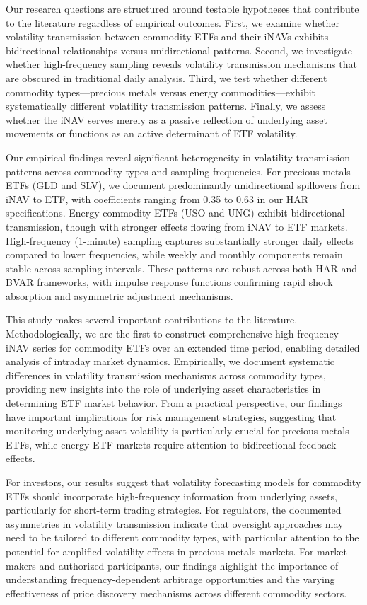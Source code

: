 Our research questions are structured around testable hypotheses that contribute to the literature regardless of empirical outcomes. First, we examine whether volatility transmission between commodity ETFs and their iNAVs exhibits bidirectional relationships versus unidirectional patterns. Second, we investigate whether high-frequency sampling reveals volatility transmission mechanisms that are obscured in traditional daily analysis. Third, we test whether different commodity types—precious metals versus energy commodities—exhibit systematically different volatility transmission patterns. Finally, we assess whether the iNAV serves merely as a passive reflection of underlying asset movements or functions as an active determinant of ETF volatility.

Our empirical findings reveal significant heterogeneity in volatility transmission patterns across commodity types and sampling frequencies. For precious metals ETFs (GLD and SLV), we document predominantly unidirectional spillovers from iNAV to ETF, with coefficients ranging from 0.35 to 0.63 in our HAR specifications. Energy commodity ETFs (USO and UNG) exhibit bidirectional transmission, though with stronger effects flowing from iNAV to ETF markets. High-frequency (1-minute) sampling captures substantially stronger daily effects compared to lower frequencies, while weekly and monthly components remain stable across sampling intervals. These patterns are robust across both HAR and BVAR frameworks, with impulse response functions confirming rapid shock absorption and asymmetric adjustment mechanisms.

This study makes several important contributions to the literature. Methodologically, we are the first to construct comprehensive high-frequency iNAV series for commodity ETFs over an extended time period, enabling detailed analysis of intraday market dynamics. Empirically, we document systematic differences in volatility transmission mechanisms across commodity types, providing new insights into the role of underlying asset characteristics in determining ETF market behavior. From a practical perspective, our findings have important implications for risk management strategies, suggesting that monitoring underlying asset volatility is particularly crucial for precious metals ETFs, while energy ETF markets require attention to bidirectional feedback effects.

For investors, our results suggest that volatility forecasting models for commodity ETFs should incorporate high-frequency information from underlying assets, particularly for short-term trading strategies. For regulators, the documented asymmetries in volatility transmission indicate that oversight approaches may need to be tailored to different commodity types, with particular attention to the potential for amplified volatility effects in precious metals markets. For market makers and authorized participants, our findings highlight the importance of understanding frequency-dependent arbitrage opportunities and the varying effectiveness of price discovery mechanisms across different commodity sectors.

